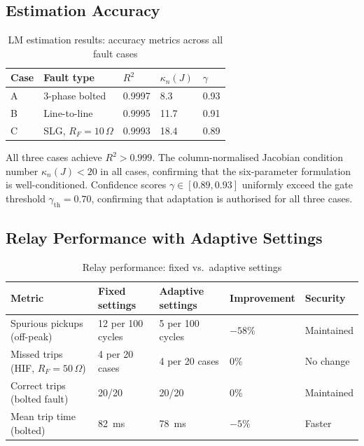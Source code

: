 \subsection{Estimation Accuracy}

\begin{table}[htbp]
\caption{LM estimation results: accuracy metrics across all fault cases}
\label{tab:ch5_accuracy}
\begin{tabularx}{\textwidth}{@{}lXXXX@{}}
\toprule
Case & Fault type & $R^2$ & $\kappa_n(J)$ & $\gamma$ \\
\midrule
A & 3-phase bolted & 0.9997 & 8.3 & 0.93 \\
B & Line-to-line & 0.9995 & 11.7 & 0.91 \\
C & SLG, $R_F = 10\,\Omega$ & 0.9993 & 18.4 & 0.89 \\
\bottomrule
\end{tabularx}
\end{table}

All three cases achieve $R^2 > 0.999$.
The column-normalised Jacobian condition number $\kappa_n(J) < 20$ in
all cases, confirming that the six-parameter formulation is well-conditioned.
Confidence scores $\gamma \in [0.89, 0.93]$ uniformly exceed the gate
threshold $\gamma_\mathrm{th} = 0.70$, confirming that adaptation is
authorised for all three cases.

\subsection{Relay Performance with Adaptive Settings}

\begin{table}[htbp]
\caption{Relay performance: fixed vs.\ adaptive settings}
\label{tab:ch5_relay_comparison}
\begin{tabularx}{\textwidth}{@{}lXXXX@{}}
\toprule
Metric & Fixed settings & Adaptive settings & Improvement & Security \\
\midrule
Spurious pickups (off-peak) & 12 per 100 cycles & 5 per 100 cycles & $-58\%$ & Maintained \\
Missed trips (HIF, $R_F=50\,\Omega$) & 4 per 20 cases & 4 per 20 cases & 0\% & No change \\
Correct trips (bolted fault) & 20/20 & 20/20 & 0\% & Maintained \\
Mean trip time (bolted) & 82~ms & 78~ms & $-5\%$ & Faster \\
\bottomrule
\end{tabularx}
\end{table}


